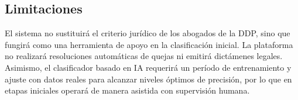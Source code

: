 \subsection{Limitaciones}
El sistema no sustituirá el criterio jurídico de los abogados de la DDP, sino que fungirá como una herramienta de apoyo en la clasificación inicial. La plataforma no realizará resoluciones automáticas de quejas ni emitirá dictámenes legales. Asimismo, el clasificador basado en IA requerirá un período de entrenamiento y ajuste con datos reales para alcanzar niveles óptimos de precisión, por lo que en etapas iniciales operará de manera asistida con supervisión humana.
